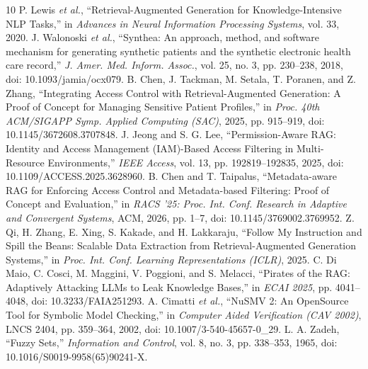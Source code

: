 \balance
\begin{thebibliography}{10}
 P. Lewis \emph{et al.}, ``Retrieval-Augmented Generation for Knowledge-Intensive NLP Tasks,'' in \emph{Advances in Neural Information Processing Systems}, vol. 33, 2020.
 J. Walonoski \emph{et al.}, ``Synthea: An approach, method, and software mechanism for generating synthetic patients and the synthetic electronic health care record,'' \emph{J. Amer. Med. Inform. Assoc.}, vol. 25, no. 3, pp. 230--238, 2018, doi: 10.1093/jamia/ocx079.
 B. Chen, J. Tackman, M. Setala, T. Poranen, and Z. Zhang, ``Integrating Access Control with Retrieval-Augmented Generation: A Proof of Concept for Managing Sensitive Patient Profiles,'' in \emph{Proc. 40th ACM/SIGAPP Symp. Applied Computing (SAC)}, 2025, pp. 915--919, doi: 10.1145/3672608.3707848.
 J. Jeong and S. G. Lee, ``Permission-Aware RAG: Identity and Access Management (IAM)-Based Access Filtering in Multi-Resource Environments,'' \emph{IEEE Access}, vol. 13, pp. 192819--192835, 2025, doi: 10.1109/ACCESS.2025.3628960.
 B. Chen and T. Taipalus, ``Metadata-aware RAG for Enforcing Access Control and Metadata-based Filtering: Proof of Concept and Evaluation,'' in \emph{RACS '25: Proc. Int. Conf. Research in Adaptive and Convergent Systems}, ACM, 2026, pp. 1--7, doi: 10.1145/3769002.3769952.
 Z. Qi, H. Zhang, E. Xing, S. Kakade, and H. Lakkaraju, ``Follow My Instruction and Spill the Beans: Scalable Data Extraction from Retrieval-Augmented Generation Systems,'' in \emph{Proc. Int. Conf. Learning Representations (ICLR)}, 2025.
 C. Di Maio, C. Cosci, M. Maggini, V. Poggioni, and S. Melacci, ``Pirates of the RAG: Adaptively Attacking LLMs to Leak Knowledge Bases,'' in \emph{ECAI 2025}, pp. 4041--4048, doi: 10.3233/FAIA251293.
 A. Cimatti \emph{et al.}, ``NuSMV 2: An OpenSource Tool for Symbolic Model Checking,'' in \emph{Computer Aided Verification (CAV 2002)}, LNCS 2404, pp. 359--364, 2002, doi: 10.1007/3-540-45657-0\_29.
 L. A. Zadeh, ``Fuzzy Sets,'' \emph{Information and Control}, vol. 8, no. 3, pp. 338--353, 1965, doi: 10.1016/S0019-9958(65)90241-X.
\end{thebibliography}
